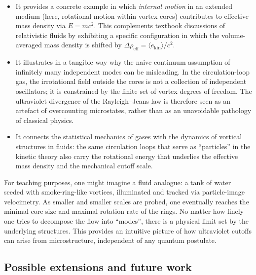 \documentclass[11pt]{article}
\begin{document}
            \begin{itemize}
                \item It provides a concrete example in which \emph{internal motion} in an extended
                medium (here, rotational motion within vortex cores) contributes to effective
                mass density via $E = mc^2$. This complements textbook discussions of
                relativistic fluids by exhibiting a specific configuration in which the
                volume-averaged mass density is shifted by $\Delta\rho_{\mathrm{eff}}
                = \langle e_{\mathrm{kin}}\rangle/c^2$.

                \item It illustrates in a tangible way why the naive continuum assumption of
                infinitely many independent modes can be misleading. In the circulation-loop
                gas, the irrotational field outside the cores is not a collection of independent
                oscillators; it is constrained by the finite set of vortex degrees of freedom.
                The ultraviolet divergence of the Rayleigh--Jeans law is therefore seen as an
                artefact of overcounting microstates, rather than as an unavoidable pathology
                of classical physics.

                \item It connects the statistical mechanics of gases with the dynamics of vortical
                structures in fluids: the same circulation loops that serve as ``particles''
                in the kinetic theory also carry the rotational energy that underlies the
                effective mass density and the mechanical cutoff scale.
            \end{itemize}

            For teaching purposes, one might imagine a fluid analogue: a tank of water seeded with
            smoke-ring-like vortices, illuminated and tracked via particle-image velocimetry.
            As smaller and smaller scales are probed, one eventually reaches the minimal core
            size and maximal rotation rate of the rings. No matter how finely one tries to
            decompose the flow into ``modes'', there is a physical limit set by the underlying
            structures. This provides an intuitive picture of how ultraviolet cutoffs can arise
            from microstructure, independent of any quantum postulate.

        \subsection{Possible extensions and future work}
\end{document}
